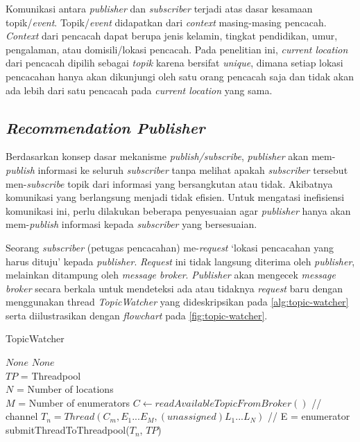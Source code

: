 Komunikasi antara \textit{publisher} dan \textit{subscriber} terjadi atas dasar kesamaan topik/\textit{event}. Topik/\textit{event} didapatkan dari \textit{context} masing-masing pencacah. \textit{Context} dari pencacah dapat berupa jenis kelamin, tingkat pendidikan, umur, pengalaman, atau domisili/lokasi pencacah. Pada penelitian ini, \textit{current location} dari pencacah dipilih sebagai \textit{topik} karena bersifat \textit{unique}, dimana setiap lokasi pencacahan hanya akan dikunjungi oleh satu orang pencacah saja dan tidak akan ada lebih dari satu pencacah pada \textit{current location} yang sama.


\subsection{\textit{Recommendation Publisher}}
\label{ssec:publisher}
Berdasarkan konsep dasar mekanisme \textit{publish/subscribe}, \textit{publisher} akan mem-\textit{publish} informasi ke seluruh \textit{subscriber} tanpa melihat apakah \textit{subscriber} tersebut men-\textit{subscribe} topik dari informasi yang bersangkutan atau tidak. Akibatnya komunikasi yang berlangsung menjadi tidak efisien. Untuk mengatasi inefisiensi komunikasi ini, perlu dilakukan beberapa penyesuaian agar \textit{publisher} hanya akan mem-\textit{publish} informasi kepada \textit{subscriber} yang bersesuaian. 

Seorang \textit{subscriber} (petugas pencacahan) me-\textit{request} `lokasi pencacahan yang harus dituju' kepada \textit{publisher}. \textit{Request} ini tidak langsung diterima oleh \textit{publisher}, melainkan ditampung oleh \textit{message broker}. \textit{Publisher} akan mengecek \textit{message broker} secara berkala untuk mendeteksi ada atau tidaknya \textit{request} baru dengan menggunakan thread \textit{TopicWatcher} yang dideskripsikan pada \autoref{alg:topic-watcher} serta diilustrasikan dengan \textit{flowchart} pada \autoref{fig:topic-watcher}. 


\begin{algorithm}[!]
	\caption{TopicWatcher}
	\label{alg:topic-watcher}
	\begin{algorithmic}[1]
		\renewcommand{\algorithmicrequire}{\textbf{Input:}}
		\renewcommand{\algorithmicensure}{\textbf{Output:}}
		\REQUIRE $None$
		\ENSURE  $None$
		\\ $TP$ = Threadpool
		\\ $N$ = Number of locations
		\\ $M$ = Number of enumerators
		\STATE $C \leftarrow readAvailableTopicFromBroker()$	// channel
		\STATE $T_n = Thread(C_m, E_1...E_M, (unassigned) L_1...L_N)$		// E = enumerator
		\STATE submitThreadToThreadpool($T_n$, $TP$)
		\ENDIF
		\ENDFOR
		\ENDFOR
		\ENDWHILE
	\end{algorithmic}
\end{algorithm}


